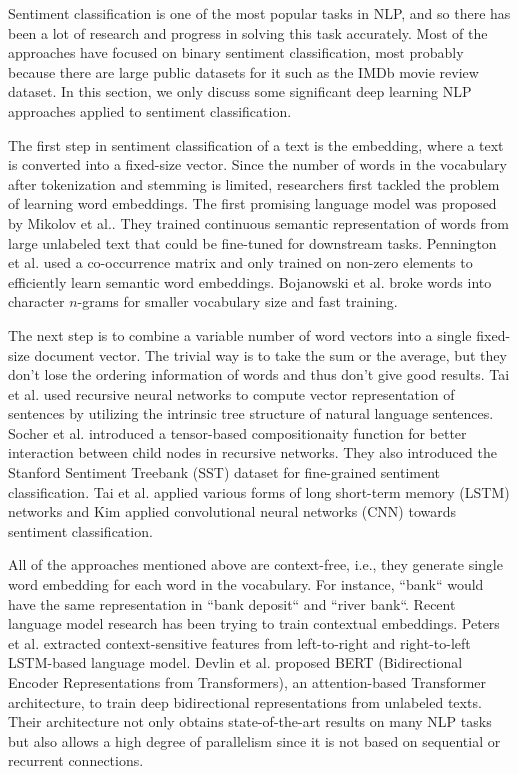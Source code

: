 \documentclass[conference]{IEEEtran}
\begin{document}
Sentiment classification is one of the most popular tasks in NLP, and so there has been a lot of research and progress in solving this task accurately. Most of the approaches have focused on binary sentiment classification, most probably because there are large public datasets for it such as the IMDb movie review dataset\cite{imdb-dataset}. In this section, we only discuss some significant deep learning NLP approaches applied to sentiment classification.

The first step in sentiment classification of a text is the embedding, where a text is converted into a fixed-size vector. Since the number of words in the vocabulary after tokenization and stemming is limited, researchers first tackled the problem of learning word embeddings. The first promising language model was proposed by Mikolov et al.\cite{wordvec}. They trained continuous semantic representation of words from large unlabeled text that could be fine-tuned for downstream tasks. Pennington et al.\cite{glove} used a co-occurrence matrix and only trained on non-zero elements to efficiently learn semantic word embeddings. Bojanowski et al.\cite{fasttext} broke words into character $n$-grams for smaller vocabulary size and fast training.

The next step is to combine a variable number of word vectors into a single fixed-size document vector. The trivial way is to take the sum or the average, but they don't lose the ordering information of words and thus don't give good results. Tai et al.\cite{rnn-sentiment} used recursive neural networks to compute vector representation of sentences by utilizing the intrinsic tree structure of natural language sentences. Socher et al.\cite{rntn} introduced a tensor-based compositionaity function for better interaction between child nodes in recursive networks. They also introduced the Stanford Sentiment Treebank (SST) dataset for fine-grained sentiment classification. Tai et al.\cite{lstm} applied various forms of long short-term memory (LSTM) networks and Kim\cite{cnn} applied convolutional neural networks (CNN) towards sentiment classification.

All of the approaches mentioned above are context-free, i.e., they generate single word embedding for each word in the vocabulary. For instance, ``bank`` would have the same representation in ``bank deposit`` and ``river bank``. Recent language model research has been trying to train contextual embeddings. Peters et al.\cite{elmo} extracted context-sensitive features from left-to-right and right-to-left LSTM-based language model. Devlin et al.\cite{bert} proposed BERT (Bidirectional Encoder Representations from Transformers), an attention-based Transformer architecture\cite{attention}, to train deep bidirectional representations from unlabeled texts. Their architecture not only obtains state-of-the-art results on many NLP tasks but also allows a high degree of parallelism since it is not based on sequential or recurrent connections.
\end{document}

